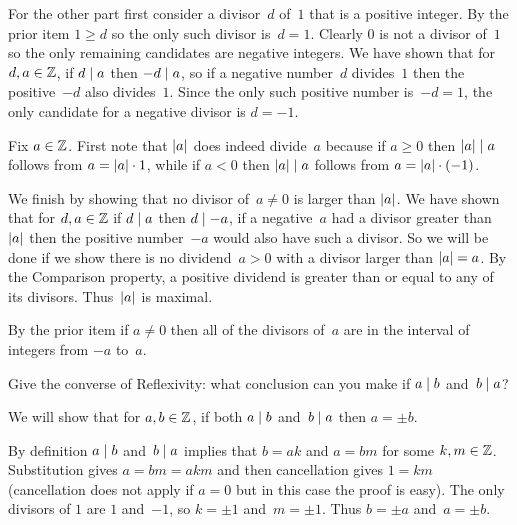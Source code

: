 \documentclass{ibl}
\begin{document}
\begin{ex}
\begin{ans}
\begin{exes}
  For the other part 
  first consider a divisor~$d$ of~$1$ that is a positive integer.
  By the prior item $1\geq d$ so the only such divisor is~$d=1$.
  Clearly $0$ is not a divisor of~$1$ so the only remaining candidates
  are negative integers.
  We have shown that for $d,a\in\mathbb{Z}$, if $d\mid a$ then $-d\mid a$,
  so if a negative number~$d$ divides~$1$ then the positive~$-d$ 
  also divides~$1$.
  Since the only such positive number is~$-d=1$, the only 
  candidate for a negative divisor is $d=-1$. 
\item Fix $a\in\mathbb{Z}$. 
  First note that $\lvert a\rvert$ does indeed divide~$a$ because
  if $a\geq 0$ then $\lvert a\rvert\mid a$ follows from 
  $a=\lvert a\rvert\cdot 1$,
  while if $a<0$ then $\lvert a\rvert\mid a$ follows from 
  $a=\lvert a\rvert\cdot(-1)$.

  We finish by showing that no divisor of~$a\neq 0$ is larger than $\lvert a\rvert$.
  We have shown that for $d,a\in\mathbb{Z}$ if $d\mid a$ then $d\mid -a$,
  if a negative~$a$ had a divisor greater than~$\lvert a\rvert$ then the
  positive number~$-a$ would also have such a divisor.
  So we will be done if
  we show there is no dividend~$a>0$ with a divisor larger than $\lvert a\rvert=a$.
  By the Comparison property, a positive dividend is greater than or 
  equal to any of its divisors. 
  Thus~$\lvert a\rvert$ is maximal.
\item By the prior item if $a\neq 0$ then all of the divisors of~$a$
  are in the interval of integers from $-a$ to~$a$. 
\end{exes}
\end{ans}
\end{ex}

\begin{ex}
Give the converse of Reflexivity: what conclusion can you make
if $a\mid b$ and~$b\mid a$?
\begin{ans}
We will show that for $a,b\in\mathbb{Z}$, if both $a\mid b$ and~$b\mid a$
then $a=\pm b$.

By definition $a\mid b$ and~$b\mid a$ implies that $b=ak$
and $a=bm$ for some $k,m\in\mathbb{Z}$.
Substitution gives $a=bm=akm$ and then cancellation gives $1=km$ (cancellation
does not apply if $a=0$ but in this case the proof is easy).
The only divisors of $1$ are $1$ and~$-1$, so $k=\pm 1$ and~$m=\pm 1$. 
Thus $b=\pm a$ and~$a=\pm b$.
\end{ans}
\end{ex}
\end{document}
